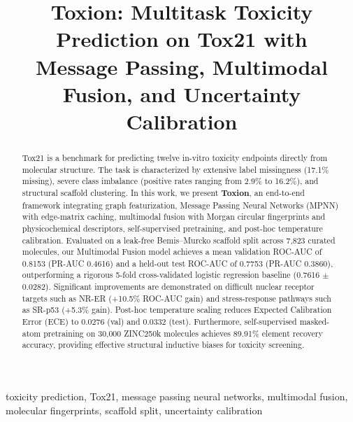 \documentclass[conference]{IEEEtran}
\begin{document}
\title{Toxion: Multitask Toxicity Prediction on Tox21 with\\
Message Passing, Multimodal Fusion, and Uncertainty Calibration}

\author{
}

\maketitle

\begin{abstract}
Tox21 is a benchmark for predicting twelve in-vitro toxicity endpoints directly from molecular structure. The task is characterized by extensive label missingness (17.1\% missing), severe class imbalance (positive rates ranging from 2.9\% to 16.2\%), and structural scaffold clustering. In this work, we present \textbf{Toxion}, an end-to-end framework integrating graph featurization, Message Passing Neural Networks (MPNN) with edge-matrix caching, multimodal fusion with Morgan circular fingerprints and physicochemical descriptors, self-supervised pretraining, and post-hoc temperature calibration. Evaluated on a leak-free Bemis--Murcko scaffold split across 7{,}823 curated molecules, our Multimodal Fusion model achieves a mean validation ROC-AUC of 0.8153 (PR-AUC 0.4616) and a held-out test ROC-AUC of 0.7753 (PR-AUC 0.3860), outperforming a rigorous 5-fold cross-validated logistic regression baseline (0.7616 $\pm$ 0.0282). Significant improvements are demonstrated on difficult nuclear receptor targets such as NR-ER (+10.5\% ROC-AUC gain) and stress-response pathways such as SR-p53 (+5.3\% gain). Post-hoc temperature scaling reduces Expected Calibration Error (ECE) to 0.0276 (val) and 0.0332 (test). Furthermore, self-supervised masked-atom pretraining on 30{,}000 ZINC250k molecules achieves 89.91\% element recovery accuracy, providing effective structural inductive biases for toxicity screening.
\end{abstract}

\begin{IEEEkeywords}
toxicity prediction, Tox21, message passing neural networks, multimodal fusion, molecular fingerprints, scaffold split, uncertainty calibration
\end{IEEEkeywords}
\end{document}
